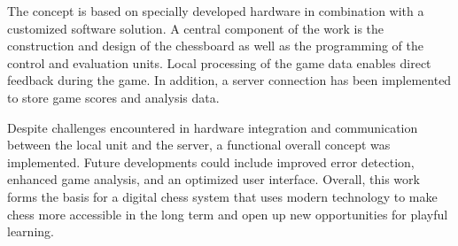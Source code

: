 The concept is based on specially developed hardware in combination with a customized software solution. A central 
component of the work is the construction and design of the chessboard as well as the programming of the control and 
evaluation units. Local processing of the game data enables direct feedback during the game. In addition, a server 
connection has been implemented to store game scores and analysis data.

Despite challenges encountered in hardware integration and communication between the local unit and the server, a 
functional overall concept was implemented. Future developments could include improved error detection, enhanced 
game analysis, and an optimized user interface. Overall, this work forms the basis for a digital chess system that 
uses modern technology to make chess more accessible in the long term and open up new opportunities for playful 
learning. \\
